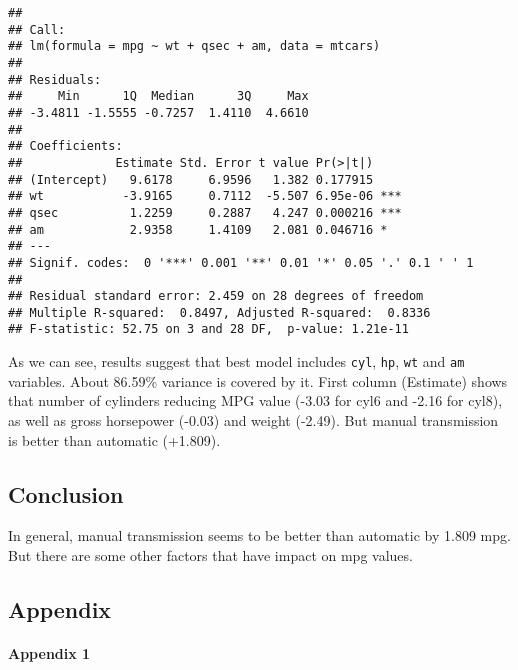 \documentclass[
]{article}
\newenvironment{Shaded}{\begin{snugshade}}{\end{snugshade}}
\newcommand{\AttributeTok}[1]{\textcolor[rgb]{0.77,0.63,0.00}{#1}}
\newcommand{\DecValTok}[1]{\textcolor[rgb]{0.00,0.00,0.81}{#1}}
\newcommand{\FunctionTok}[1]{\textcolor[rgb]{0.00,0.00,0.00}{#1}}
\newcommand{\NormalTok}[1]{#1}
\newcommand{\SpecialCharTok}[1]{\textcolor[rgb]{0.00,0.00,0.00}{#1}}
\newcommand{\StringTok}[1]{\textcolor[rgb]{0.31,0.60,0.02}{#1}}
\begin{document}
\begin{verbatim}
## 
## Call:
## lm(formula = mpg ~ wt + qsec + am, data = mtcars)
## 
## Residuals:
##     Min      1Q  Median      3Q     Max 
## -3.4811 -1.5555 -0.7257  1.4110  4.6610 
## 
## Coefficients:
##             Estimate Std. Error t value Pr(>|t|)    
## (Intercept)   9.6178     6.9596   1.382 0.177915    
## wt           -3.9165     0.7112  -5.507 6.95e-06 ***
## qsec          1.2259     0.2887   4.247 0.000216 ***
## am            2.9358     1.4109   2.081 0.046716 *  
## ---
## Signif. codes:  0 '***' 0.001 '**' 0.01 '*' 0.05 '.' 0.1 ' ' 1
## 
## Residual standard error: 2.459 on 28 degrees of freedom
## Multiple R-squared:  0.8497, Adjusted R-squared:  0.8336 
## F-statistic: 52.75 on 3 and 28 DF,  p-value: 1.21e-11
\end{verbatim}

As we can see, results suggest that best model includes \texttt{cyl},
\texttt{hp}, \texttt{wt} and \texttt{am} variables. About 86.59\%
variance is covered by it. First column (Estimate) shows that number of
cylinders reducing MPG value (-3.03 for cyl6 and -2.16 for cyl8), as
well as gross horsepower (-0.03) and weight (-2.49). But manual
transmission is better than automatic (+1.809).

\hypertarget{conclusion}{%
\subsection{Conclusion}\label{conclusion}}

In general, manual transmission seems to be better than automatic by
1.809 mpg. But there are some other factors that have impact on mpg
values.

\hypertarget{appendix}{%
\subsection{Appendix}\label{appendix}}

\hypertarget{appendix-1}{%
\paragraph{Appendix 1}\label{appendix-1}}

\begin{Shaded}
\end{Shaded}
\end{document}
